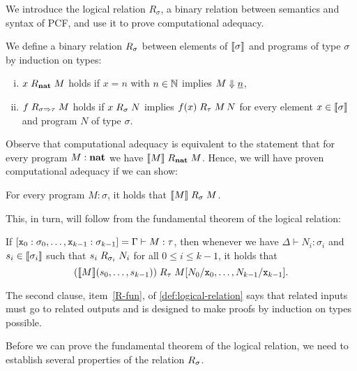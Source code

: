 We introduce the logical relation \(R_\sigma\), a binary relation between
semantics and syntax of PCF, and use it to prove computational adequacy.

\begin{definition}\label{def:logical-relation}
  We define a binary relation \(\mathrel{R}_\sigma\) between elements of
  \(\llbracket\sigma\rrbracket\) and programs of type \(\sigma\) by induction on types:
  \begin{enumerate}[(i)]
  \item\label{R-nat} \({x \mathrel{R}_{\mathtt{\mathbf{nat}}} M}\) holds if \(x = n\) with
    \(n \in \mathbb N\) implies \(M \Downarrow \underline{n}\),
  \item\label{R-fun} \(f \mathrel{R}_{\sigma \Rightarrow \tau} M\) holds if \(x \mathrel{R}_\sigma N\)
    implies \({f(x)} \mathrel{R}_\tau {M \, N}\) for every element
    \(x \in \llbracket\sigma\rrbracket\) and program \(N\) of type \(\sigma\).
  \end{enumerate}
\end{definition}

Observe that computational adequacy is equivalent to the statement that for
every program \(M : \mathtt{\mathbf{nat}}\) we have \(\llbracket M\rrbracket \mathrel{R}_\mathtt{\mathbf{nat}} M\).
%
Hence, we will have proven computational adequacy if we can show:

\begin{lemma*}
  For every program \(M : \sigma\), it holds that \(\llbracket M\rrbracket \mathrel{R}_\sigma M\).
\end{lemma*}

This, in turn, will follow from the fundamental theorem of the logical relation:

\begin{lemma*}\label{fundamental-theorem}
  If
  \([\mathtt x_0 : \sigma_0 , \dots , \mathtt x_{k-1} : \sigma_{k-1}] = \Gamma \vdash
  M : \tau\), then whenever we have \(\Delta \vdash N_i : \sigma_i\) and
  \(s_i \in \llbracket\sigma_i\rrbracket\) such that \(s_i \mathrel{R}_{\sigma_i} N_i\) for
  all \(0 \leq i \leq k-1\), it holds that
  \[
    \pa*{\densem{M}\pa*{s_0,\dots,s_{k-1}}} \logrel_{\tau} {M[N_0/\var x_0,\dots,N_{k-1}/\var x_{k-1}]}.
  \]
\end{lemma*}

The second clause, item~\ref{R-fun}, of \cref{def:logical-relation} says that
related inputs must go to related outputs and is designed to make proofs by
induction on types possible.

Before we can prove the fundamental theorem of the logical relation, we need to
establish several properties of the relation \(\mathrel{R}_\sigma\).

